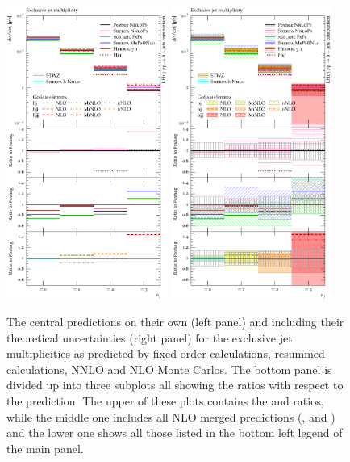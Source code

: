 \begin{figure}[t!]
  \centering
  \includegraphics[width=0.47\textwidth]{figures/hjetscomp_u_NJet_excl_30.pdf}
  \hfill
  \includegraphics[width=0.47\textwidth]{figures/hjetscomp_NJet_excl_30.pdf}
  \caption{\label{fig:hjetscomp:results:inclobs:njets_excl}%
    The central predictions on their own (left panel) and including their
    theoretical uncertainties (right panel) for the exclusive jet multiplicities
    as predicted by fixed-order calculations, resummed calculations,
    NNLO and NLO Monte Carlos. The bottom panel is divided up into
    three subplots all showing the ratios with respect to the \hjetscompPowheg
    \hjetscompNNLOPS prediction. The upper of these plots contains the \hjetscompHej and
    \hjetscompSherpa \hjetscompNNLOPS ratios, while the middle one includes all NLO
    merged predictions (\hjetscompMGaMC, \hjetscompHerwig and \hjetscompSherpa) and the lower one
    shows all those listed in the bottom left legend of the main panel.}
\end{figure}

